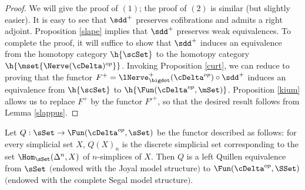 \begin{proof}
We will give the proof of $(1)$; the proof of $(2)$ is similar (but slightly easier). It is easy to see
that $\sdd^{+}$ preserves cofibrations and admits a right adjoint. Proposition \ref{slape} implies that $\sdd^{+}$ preserves weak equivalences. To complete the proof, it will suffice to show that
$\sdd^{+}$ induces an equivalence from the homotopy category $\h{ \scSet}$ to the homotopy
category $\h{ \mset{ \Nerve(\cDelta)^{op} }}$. Invoking Proposition \ref{curt}, we can reduce to proving that the functor $F^{+} = \lNerve^{+}_{\bigdot}( \cDelta^{op}) \circ \sdd^{+}$ induces an
equivalence from $\h{ \scSet}$ to $\h{ \Fun( \cDelta^{op}, \mSet)}$. Proposition \ref{kium} allows
us to replace $F^{+}$ by the functor ${F'}^{+}$, so that the desired result follows from Lemma \ref{slappus}. 
\end{proof}

\begin{corollary}\label{JT}
Let $Q: \sSet \rightarrow \Fun( \cDelta^{op}, \sSet)$ be the functor described as follows:
for every simplicial set $X$, $Q(X)_{n}$ is the discrete simplicial set corresponding to the
set $\Hom_{\sSet}( \Delta^n, X)$ of $n$-simplices of $X$. Then
$Q$ is a left Quillen equivalence from $\sSet$ $($endowed with the Joyal model structure$)$
to $\Fun( \cDelta^{op}, \SSet)$ $($endowed with the complete Segal model structure$)$.
\end{corollary}

